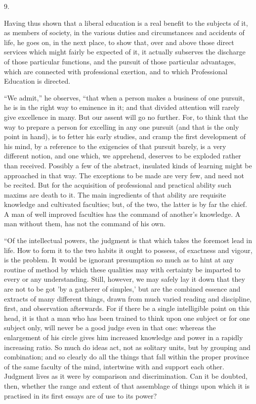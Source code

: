 9.

Having thus shown that a liberal education is a real benefit to the
subjects of it, as members of society, in the various duties and
circumstances and accidents of life, he goes on, in the next place, to
show that, over and above those direct services which might fairly be
expected of it, it actually subserves the discharge of those
particular functions, and the pursuit of those particular advantages,
which are connected with professional exertion, and to which
Professional Education is directed.

``We admit,'' he observes, ``that when a person makes a
business of one pursuit, he is in the right way to eminence in it; and
that divided attention will rarely give excellence in many. But our
assent will go no further. For, to think that the way to prepare a
person for excelling in any one pursuit (and that is the only point in
hand), is to fetter his early studies, and cramp the first development
of his mind, by a reference to the exigencies of that pursuit barely,
is a very different notion, and one which, we apprehend, deserves to
be exploded rather than received. Possibly a few of the abstract,
insulated kinds of learning might be approached in that way. The
exceptions to be made are very few, and need not be recited. But for
the acquisition of professional and practical ability such maxims are
death to it. The main ingredients of that ability are requisite
knowledge and cultivated faculties; but, of the two, the latter is by
far the chief. A man of well improved faculties has the command of
another's knowledge. A man without them, has not the command of his
own.

``Of the intellectual powers, the judgment is that which takes
the foremost lead in life. How to form it to the two habits it ought
to possess, of exactness and vigour, is the problem. It would be
ignorant presumption so much as to hint at any routine of method by
which these qualities may with certainty be imparted to every or any
understanding. Still, however, we may safely lay it down that they are
not to be got 'by a gatherer of simples,' but are the combined essence
and extracts of many different things, drawn from much varied reading
and discipline, first, and observation afterwards. For if there be a
single intelligible point on this head, it is that a man who has been
trained to think upon one subject or for one subject only, will never
be a good judge even in that one: whereas the enlargement of his
circle gives him increased knowledge and power in a rapidly increasing
ratio. So much do ideas act, not as solitary units, but by grouping
and combination; and so clearly do all the things that fall within the
proper province of the same faculty of the mind, intertwine with and
support each other. Judgment lives as it were by comparison and
discrimination. Can it be doubted, then, whether the range and extent
of that assemblage of things upon which it is practised in its first
essays are of use to its power?

